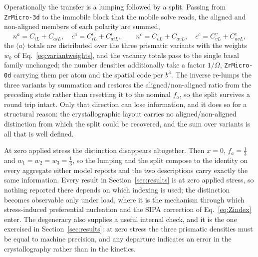 \documentclass{article}
\newcommand{\aloop}{\ensuremath{\langle a\rangle}}
\newcommand{\ZrM}{\texttt{ZrMicro-3d}}
\newcommand{\ZrOd}{\texttt{ZrMicro-0d}}
\begin{document}
Operationally the transfer is a lumping followed by a split. Passing from {\ZrM}
to the immobile block that the mobile solve reads, the aligned and non-aligned
members of each polarity are summed,
\begin{equation}
n^{a}=C_{iL}+C_{aiL},\quad c^{a}=C^{i}_{iL}+C^{i}_{aiL},\qquad
n^{c}=C_{vL}+C_{avL},\quad c^{c}=C^{v}_{vL}+C^{v}_{avL},
\label{eq:lumpsplit}
\end{equation}
the \aloop{} totals are distributed over the three prismatic variants with the
weights $w_k$ of Eq.~\eqref{eq:variantweights}, and the vacancy totals pass to the
single basal family unchanged; the number densities additionally take a factor
$1/\Omega$, {\ZrOd} carrying them per atom and the spatial code per $b^3$. The inverse
re-lumps the three variants by summation and restores the aligned/non-aligned
ratio from the preceding state rather than resetting it to the nominal $f_a$, so
the split survives a round trip intact. Only that direction can lose information,
and it does so for a structural reason: the crystallographic layout carries no
aligned/non-aligned distinction from which the split could be recovered, and the
sum over variants is all that is well defined.

At zero applied stress the distinction disappears altogether. Then $x=0$,
$f_a=\tfrac13$ and $w_1=w_2=w_3=\tfrac13$, so the lumping and the split compose to
the identity on every aggregate either model reports and the two descriptions
carry exactly the same information. Every result in Section~\ref{sec:results} is
at zero applied stress, so nothing reported there depends on which indexing is
used; the distinction becomes observable only under load, where it is the
mechanism through which stress-induced preferential nucleation and the SIPA
correction of Eq.~\eqref{eq:Zindex} enter. The degeneracy also supplies a useful
internal check, and it is the one exercised in Section~\ref{sec:results}: at zero
stress the three prismatic densities must be equal to machine precision, and any
departure indicates an error in the crystallography rather than in the kinetics.
\end{document}
